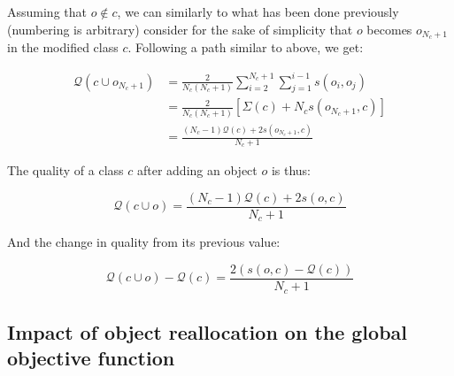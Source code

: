 \documentclass[10pt,journal,compsoc]{IEEEtran}
\begin{document}
Assuming that $o \notin c$, we can similarly to what has been done previously (numbering is arbitrary) consider for the sake of simplicity that $o$ becomes $o_{N_c+1}$ in the modified class $c$. Following a path similar to above, we get:

\begin{equation}
  \begin{aligned}
    \mathcal{Q}(c \cup o_{N_c+1}) & = \frac{2}{N_c(N_c+1)} \sum_{i=2}^{N_c+1} \sum_{j=1}^{i-1} s\left(o_i, o_j\right) \\
                                & = \frac{2}{N_c(N_c+1)} \left[\Sigma(c) + N_c s\left(o_{N_c+1}, c\right)\right] \\
                                & = \frac{(N_c-1) \mathcal{Q}(c)  + 2s\left(o_{N_c+1}, c\right)}{N_c+1}
  \end{aligned}
\end{equation}

\noindent The quality of a class $c$ after adding an object $o$ is thus:

\begin{equation}
  \mathcal{Q}\left(c \cup o\right) = \frac{(N_c-1) \mathcal{Q}(c)  + 2s\left(o, c\right)}{N_c+1}
  \label{eq:newQual_add}
\end{equation}

\noindent And the change in quality from its previous value:

\begin{equation} \label{deltaAdd}
    \mathcal{Q}\left(c \cup o\right) - \mathcal{Q}\left(c\right)  = \frac{2\left(s\left(o, c\right)-\mathcal{Q}(c)\right)}{N_c+1}
\end{equation}


\subsection{Impact of object reallocation on the global objective function}
\end{document}
